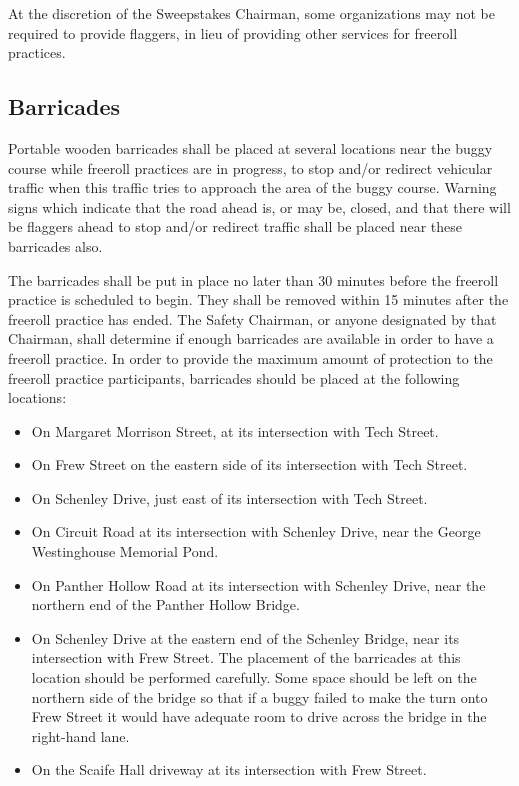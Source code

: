 	At the discretion of the Sweepstakes Chairman, some organizations may not be
	required to provide flaggers, in lieu of providing other services for freeroll
	practices.

\subsection{Barricades}

	Portable wooden barricades shall be placed at several locations near the buggy
	course while freeroll practices are in progress, to stop and/or redirect
	vehicular traffic when this traffic tries to approach the area of the buggy
	course. Warning signs which indicate that the road ahead is, or may be, closed,
	and that there will be flaggers ahead to stop and/or redirect traffic shall be
	placed near these barricades also.

	The barricades shall be put in place no later than 30 minutes before the
	freeroll practice is scheduled to begin. They shall be removed within 15
	minutes after the freeroll practice has ended. The Safety Chairman, or anyone
	designated by that Chairman, shall determine if enough barricades are available
	in order to have a freeroll practice. In order to provide the maximum amount of
	protection to the freeroll practice participants, barricades should be placed
	at the following locations:

	\begin{itemize}

		\item On Margaret Morrison Street, at its intersection with Tech Street.

		\item On Frew Street on the eastern side of its intersection with Tech
		Street.

		\item On Schenley Drive, just east of its intersection with Tech Street.

		\item On Circuit Road at its intersection with Schenley Drive, near the
		George Westinghouse Memorial Pond.

		\item On Panther Hollow Road at its intersection with Schenley Drive, near
		the northern end of the Panther Hollow Bridge.

		\item On Schenley Drive at the eastern end of the Schenley Bridge, near its
		intersection with Frew Street. The placement of the barricades at this location
		should be performed carefully. Some space should be left on the northern side
		of the bridge so that if a buggy failed to make the turn onto Frew Street it
		would have adequate room to drive across the bridge in the right-hand lane.

		\item On the Scaife Hall driveway at its intersection with Frew Street.

	\end{itemize}

